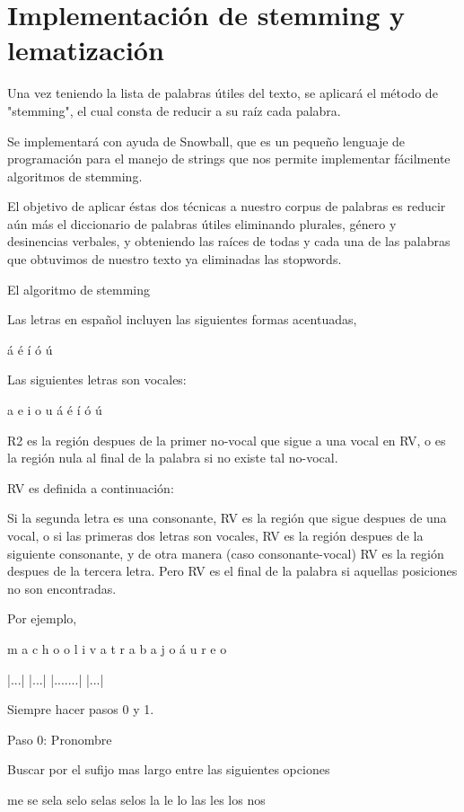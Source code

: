 \section{Implementaci\'on de stemming y lematizaci\'on}

Una vez teniendo la lista de palabras \'utiles del texto, se aplicar\'a el m\'etodo de "stemming", el cual consta de reducir a su ra\'iz cada palabra.

Se implementar\'a con ayuda de Snowball, que es un peque\~no lenguaje de programaci\'on para el manejo de strings que nos permite implementar f\'acilmente algoritmos de stemming.

El objetivo de aplicar \'estas dos t\'ecnicas a nuestro corpus de palabras es reducir a\'un m\'as el diccionario de palabras \'utiles eliminando plurales, g\'enero y desinencias verbales, y obteniendo las ra\'ices de todas y cada una de las palabras que obtuvimos de nuestro texto ya eliminadas las stopwords.

El algoritmo de stemming

Las letras en espa\~nol incluyen las siguientes formas acentuadas,

\'a   \'e   \'i   \'o   \'u 

Las siguientes letras son vocales:

a   e   i   o   u   \'a   \'e   \'i   \'o   \'u

R2 es la regi\'on despues de la primer no-vocal que sigue a una vocal en RV, o es la regi\'on nula al final de la palabra si no existe tal no-vocal.

RV es definida a continuaci\'on: 

Si la segunda letra es una consonante, RV es la regi\'on que sigue despues de una vocal, o si las primeras dos letras son vocales, RV es la regi\'on despues de la siguiente consonante, y de otra manera (caso consonante-vocal) RV es la regi\'on despues de la tercera letra. Pero RV es el final de la palabra si aquellas posiciones no son encontradas.

Por ejemplo, 

    m a c h o     o l i v a     t r a b a j o     á u r e o
    
         |...|         |...|         |.......|         |...|
         
Siempre hacer pasos 0 y 1. 

Paso 0: Pronombre

Buscar por el sufijo mas largo entre las siguientes opciones

me   se   sela   selo   selas   selos   la   le   lo   las   les   los   nos

